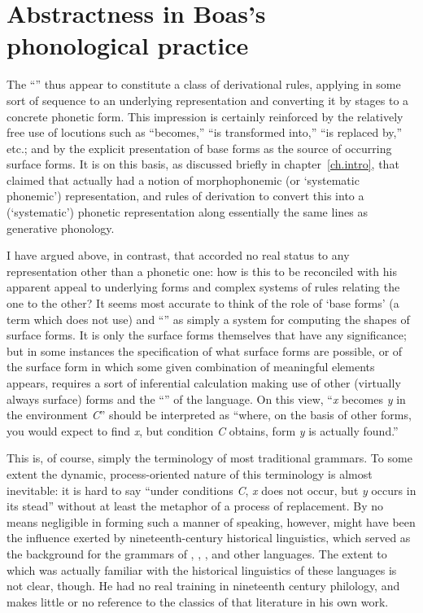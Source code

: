 \section{Abstractness in Boas's phonological practice}

The ``'' thus appear to constitute a class of derivational
rules, applying in some sort of sequence to an underlying
representation and converting it by stages to a concrete phonetic
form. This impression is certainly reinforced by the relatively free
use of locutions such as ``becomes,'' ``is transformed into,'' ``is
replaced by,'' etc.; and by the explicit presentation of base forms as
the source of occurring surface forms. It is on this basis, as
discussed briefly in chapter~\ref{ch.intro}, that \citet{postal64:boas}
claimed that {\Boas} actually had a notion of morphophonemic (or
`systematic phonemic') representation, and rules of derivation to
convert this into a (`systematic') phonetic representation along
essentially the same lines as generative phonology.

I have argued above, in {contrast}, that {\Boas} accorded no real status to
any representation other than a phonetic one: how is this to be
reconciled with his apparent appeal to underlying forms and complex
systems of rules relating the one to the other? It seems most accurate
to think of the role of `base forms' (a term which {\Boas} does not use)
and ``'' as simply a system for computing the shapes of
surface forms. It is only the surface forms themselves that have any
significance; but in some instances the specification of what surface
forms are possible, or of the surface form in which some given
combination of meaningful elements appears, requires a sort of
inferential calculation making use of other (virtually always surface)
forms and the ``'' of the language. On this view, ``\emph{x}
becomes \emph{y} in the environment \emph{C}'' should be interpreted as
``where, on the basis of other forms, you would expect to find
\emph{x}, but condition \emph{C} obtains, form \emph{y} is actually
found.''

This is, of course, simply the terminology of most traditional
grammars. To some extent the dynamic, process-oriented nature of this
terminology is almost inevitable: it is hard to say ``under conditions
\emph{C}, \emph{x} does not occur, but \emph{y} occurs in its stead''
without at least the metaphor of a process of replacement. By no means
negligible in forming such a manner of speaking, however, might have
been the influence exerted by nineteenth-century historical
linguistics, which served as the background for the grammars of ,
, , and other languages. The extent to which {\Boas} was
actually familiar with the historical linguistics of these languages
is not clear, though. He had no real training in nineteenth century
philology, and makes little or no reference to the classics of that
literature in his own work.

